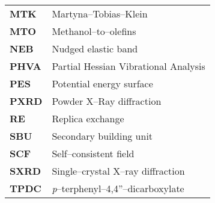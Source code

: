 \begin{longtable}{p{} p{}}
\textbf{MTK} & Martyna--Tobias--Klein \\
\textbf{MTO} & Methanol--to--olefins \\
\textbf{NEB} & Nudged elastic band \\
\textbf{PHVA} & Partial Hessian Vibrational Analysis \\
\textbf{PES} & Potential energy surface \\
\textbf{PXRD} & Powder X--Ray diffraction\\
\textbf{RE} & Replica exchange \\
\textbf{SBU} & Secondary building unit \\
\textbf{SCF} & Self--consistent field\\
\textbf{SXRD} & Single--crystal X--ray diffraction\\
\textbf{TPDC} & \emph{p}--terphenyl--4,4''--dicarboxylate \\

\end{longtable}

